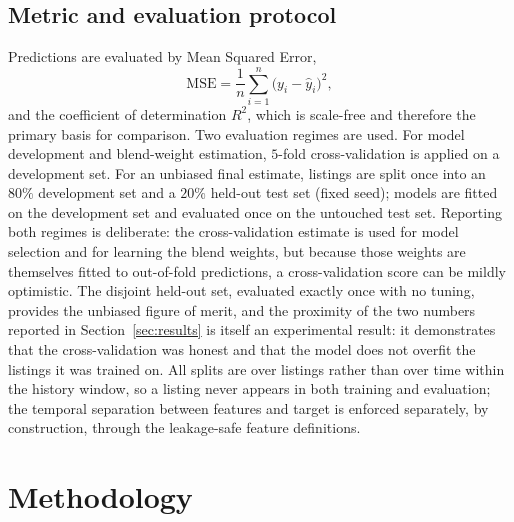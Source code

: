 \documentclass[journal]{IEEEtran}
\begin{document}
\subsection{Metric and evaluation protocol}
Predictions are evaluated by Mean Squared Error,
\begin{equation}
\text{MSE}=\frac{1}{n}\sum_{i=1}^{n}\bigl(y_i-\hat y_i\bigr)^2,
\label{eq:mse}
\end{equation}
and the coefficient of determination $R^2$, which is scale-free and therefore the
primary basis for comparison. Two evaluation regimes are used. For model
development and blend-weight estimation, $5$-fold cross-validation is applied on a
development set. For an unbiased final estimate, listings are split once into an
$80\%$ development set and a $20\%$ held-out test set (fixed seed); models are
fitted on the development set and evaluated once on the untouched test set.
Reporting both regimes is deliberate: the cross-validation estimate is used for
model selection and for learning the blend weights, but because those weights are
themselves fitted to out-of-fold predictions, a cross-validation score can be
mildly optimistic. The disjoint held-out set, evaluated exactly once with no
tuning, provides the unbiased figure of merit, and the proximity of the two
numbers reported in Section~\ref{sec:results} is itself an experimental result: it
demonstrates that the cross-validation was honest and that the model does not
overfit the listings it was trained on. All splits are over listings rather than
over time within the history window, so a listing never appears in both training
and evaluation; the temporal separation between features and target is enforced
separately, by construction, through the leakage-safe feature definitions.

\section{Methodology}
\label{sec:method}
\end{document}
